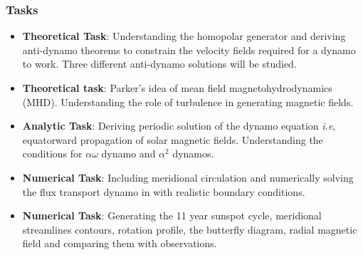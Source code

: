 \documentclass[11pt]{article}
\begin{document}
\subsubsection{Tasks}
\begin{itemize}
\item {\bf Theoretical Task}: Understanding the homopolar generator and deriving anti-dynamo theorems to constrain the velocity fields required for a dynamo to work. Three different anti-dynamo solutions will be studied.
\item {\bf Theoretical task}: Parker's idea of mean field magnetohydrodynamics (MHD). Understanding the role of turbulence in generating magnetic fields.
\item {\bf Analytic Task}: Deriving periodic solution of the dynamo equation {\it i.e}, equatorward propagation of solar magnetic fields. Understanding the conditions for $\alpha \omega$ dynamo and $\alpha^{2}$ dynamos.
\item {\bf Numerical Task}: Including meridional circulation and numerically solving the flux transport dynamo in with realistic boundary conditions. 
\item {\bf Numerical Task}: Generating the 11 year sunspot cycle, meridional streamlines contours, rotation profile, the butterfly diagram, radial magnetic field and comparing them with observations.

\end{itemize}
\end{document}
